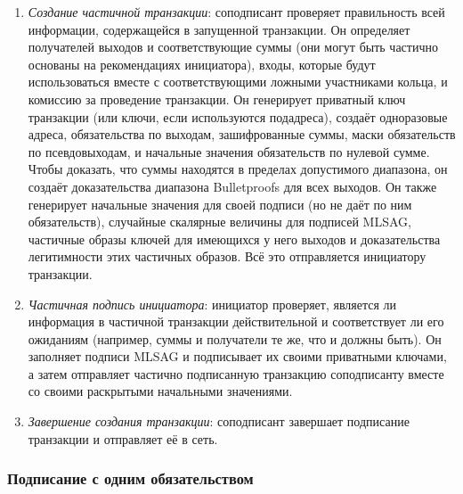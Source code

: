 \begin{enumerate}
\begin{enumerate}
        \item {\em Создание частичной транзакции}: соподписант проверяет правильность всей ин\-формации, содержащейся в запущенной транзакции. Он определяет получателей выходов и соответствующие суммы (они могут быть частично основаны на рекомен\-дациях инициатора), входы, которые будут использоваться вместе с соответствую\-щими ложными участниками кольца, и комиссию за проведение транзакции. Он генерирует приватный ключ транзакции (или ключи, если используются подад\-реса), создаёт одноразовые адреса, обязательства по выходам, зашифрованные суммы, маски обязательств по псевдовыходам, и начальные значения обязательств по нулевой сумме. Чтобы доказать, что суммы находятся в пределах допустимого диапазона, он создаёт доказательства диапазона Bulletproofs для всех выходов. Он также генерирует начальные значения для своей подписи (но не даёт по ним обязательств), случайные скалярные величины для подписей MLSAG, частичные образы ключей для имеющихся у него выходов и доказательства легитимности этих частичных образов. Всё это отправляется инициатору транзакции.
        \item {\em Частичная подпись инициатора}: инициатор проверяет, является ли информация в частичной транзакции действительной и соответствует ли его ожиданиям (напри\-мер, суммы и получатели те же, что и должны быть). Он заполняет подписи MLSAG и подписывает их своими приватными ключами, а затем отправляет частично подписанную транзакцию соподписанту вместе со своими раскрытыми начальными значениями.
        \item {\em Завершение создания транзакции}: соподписант завершает подписание транзакции и отправляет её в сеть.
    \end{enumerate}{}
\end{enumerate}{}

\subsubsection*{Подписание с одним обязательством}

